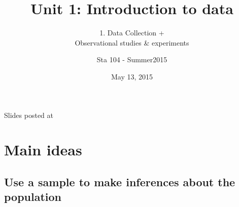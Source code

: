 \documentclass[11pt,containsverbatim,handout,xcolor=xelatex,dvipsnames,table]{beamer}
\title{Unit 1: Introduction to data}
\subtitle{1. Data Collection +\\Observational studies \& experiments}
\author{Sta 104 - Summer2015}
\date{May 13, 2015}
\institute{Duke University, Department of Statistical Science}
\begin{document}



\begin{frame}[plain]

\titlepage
\vfill
{\scriptsize {} \hfill Slides posted at  \webLink{\CourseSite}{\CourseSite}}
\addtocounter{framenumber}{-1} 

\end{frame}


\section{Main ideas}


\subsection{Use a sample to make inferences about the population}
\label{mi1}

\end{document}
